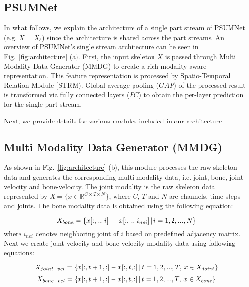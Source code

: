 \documentclass[runningheads]{llncs}
\begin{document}
\subsection{PSUMNet}
\label{sec:psumnet}

In what follows, we explain the architecture of a single part stream of PSUMNet  (e.g. $X = X_b$) since the architecture is shared across the part streams. An overview of PSUMNet's single stream architecture can be seen in Fig.~\ref{fig:architecture} (a). First, the input skeleton $X$ is passed through Multi Modality Data Generator (MMDG) to create a rich modality aware  representation. This feature representation is processed by Spatio-Temporal Relation Module (STRM). Global average pooling ($\mathit{GAP}$) of the processed result is transformed via fully connected layers ($\mathit{FC}$) to obtain the per-layer prediction for the single part stream.

Next, we provide details for various modules included in our architecture.

\subsection{Multi Modality Data Generator (MMDG)} 
\label{sec:mmdg}

As shown in Fig.~\ref{fig:architecture} (b), this module processes the raw skeleton data and generates the corresponding multi modality data, i.e. joint, bone, joint-velocity and bone-velocity. The joint modality is the raw skeleton data represented by $X = \{x \in \mathbb{R}^{C \times T \times N}\}$, where $C$, $T$ and $N$ are channels, time steps and joints. The bone modality data is obtained using the following equation:

\begin{equation}
\centering
X_{bone} = \{x[:, \, :, \, i] \,-\, x[:, \,:, \,i_{nei}]\, |\, i = 1,2, ...,N\}
\end{equation}
where $i_{nei}$ denotes neighboring joint of $i$ based on predefined adjacency matrix. Next we create joint-velocity and bone-velocity modality data using following equations:


\begin{equation}
\centering
X_{joint-vel} = \{x[:, t+1, :] - x[:, t, :] \, |\, t = 1,2, ...,T ,\, x \in X_{joint}\}
\end{equation}
\begin{equation}
\centering
X_{bone-vel} = \{x[:, t+1, :] - x[:, t, :] \, |\, t = 1,2, ...,T ,\, x \in X_{bone}\}
\end{equation}
\end{document}
